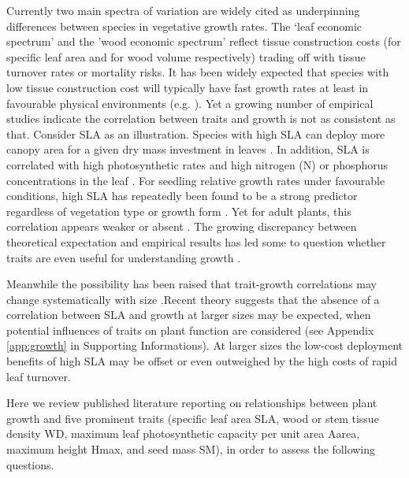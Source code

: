 \documentclass[a4paper]{article}\usepackage[]{graphicx}\usepackage[]{color}
\begin{document}
Currently two main spectra of variation are widely cited as underpinning differences between species in vegetative growth rates. The `leaf economic spectrum' \citep{Wright:2004jb} and the 'wood economic spectrum' \citep{Chave:2009iy} reflect tissue construction costs (for specific leaf area and for wood volume respectively) trading off with tissue turnover rates or mortality risks. It has been widely expected that species with low tissue construction cost will typically have fast growth rates at least in favourable physical environments (e.g. \citealt{MullerLandau:2004dc,Wright:2004jb,Poorter:2008iu,Chave:2009iy,Larjavaara:2010bn,Iida:2012jb,Paine:2015df}). Yet a growing number of empirical studies indicate the correlation between traits and growth is not as consistent as that. Consider SLA as an illustration. Species with high SLA can deploy more canopy area for a given dry mass investment in leaves \citep{Poorter:1999wd, Reich:1992wm}. In addition, SLA is correlated with high photosynthetic rates and high nitrogen (N) or phosphorus concentrations in the leaf \citep{Wright:2004jb}. For seedling relative growth rates under favourable conditions, high SLA has repeatedly been found to be a strong predictor regardless of vegetation type or growth form \citep{Lambers:1992bj,Reich:1992wm,Grime:1997wm,Poorter:1999wd,Wright:1999ds}. Yet for adult plants, this correlation appears weaker or absent \citep{coomes_comparison_1998,Poorter:2008iu,Aiba:2009ft,Easdale:2009gv,Wright:2010tp}. The growing discrepancy between theoretical expectation and empirical results has led some to question whether traits are even useful for understanding growth \citep{Wright:2010tp, Paine:2015df}.

Meanwhile the possibility has been raised that trait-growth correlations may change systematically with size \citep{Iida:2014ep,Iida:2014hq,Ruger:2012jv,Falster:2011ii}.Recent theory suggests that the absence of a correlation between SLA and growth at larger sizes may be expected, when  potential influences of traits on plant function are considered \citep{Falster:2011ii, falster:2013} (see Appendix \ref{app:growth} in Supporting Informations). At larger sizes the low-cost deployment benefits of high SLA may be offset or even outweighed by the high costs of rapid leaf turnover.

Here we review published literature reporting on relationships between
plant growth and five prominent traits (specific leaf area SLA, wood or stem tissue density WD, maximum leaf photosynthetic capacity per unit area Aarea,  maximum height Hmax, and seed mass SM), in order to assess the following questions.
\end{document}
